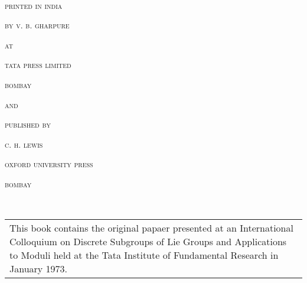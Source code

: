 \thispagestyle{empty}

~\phantom{a}

\vfill 

\begin{center}
\textsc{printed in india}

\textsc{by v. b. gharpure}

\textsc{at}

\textsc{tata press limited}

\textsc{bombay}

\textsc{and}

\textsc{published by}

\textsc{c. h. lewis}

\textsc{oxford university press}

\textsc{bombay}
\end{center}

\vfill\eject

\thispagestyle{empty}

~\phantom{a}

\vfill 

\begin{center}
\begin{tabular}{p{7.3cm}}
This book contains the original papaer presented at an International Colloquium on Discrete Subgroups of Lie Groups and Applications to Moduli held at the Tata Institute of Fundamental Research in January 1973.
\end{tabular}
\end{center}

\vfill\eject






